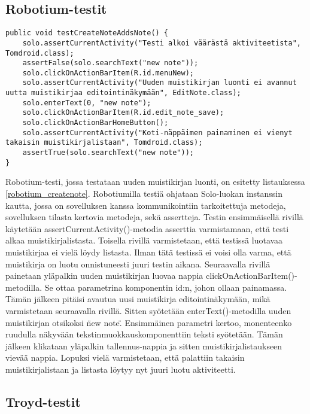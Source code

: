\subsection{Robotium-testit}

\begin{lstlisting}[float,label=robotium_createnote,caption=Muistikirjan luontitesti robotiumilla]
public void testCreateNoteAddsNote() {
	solo.assertCurrentActivity("Testi alkoi väärästä aktiviteetista", Tomdroid.class);
	assertFalse(solo.searchText("new note"));
	solo.clickOnActionBarItem(R.id.menuNew);
	solo.assertCurrentActivity("Uuden muistikirjan luonti ei avannut uutta muistikirjaa editointinäkymään", EditNote.class);
	solo.enterText(0, "new note");
	solo.clickOnActionBarItem(R.id.edit_note_save);
	solo.clickOnActionBarHomeButton();
	solo.assertCurrentActivity("Koti-näppäimen painaminen ei vienyt takaisin muistikirjalistaan", Tomdroid.class);
	assertTrue(solo.searchText("new note"));
}
\end{lstlisting}

Robotium-testi, jossa testataan uuden muistikirjan luonti, on esitetty listauksessa \ref{robotium_createnote}. Robotiumilla testiä ohjataan Solo-luokan instanssin kautta, jossa on sovelluksen kanssa kommunikointiin tarkoitettuja metodeja, sovelluksen tilasta kertovia metodeja, sekä assertteja. Testin ensimmäisellä rivillä käytetään assertCurrentActivity()-metodia asserttia varmistamaan, että testi alkaa muistikirjalistasta. Toisella rivillä varmistetaan, että testissä luotavaa muistikirjaa ei vielä löydy listasta. Ilman tätä testissä ei voisi olla varma, että muistikirja on luotu onnistuneesti juuri testin aikana. Seuraavalla rivillä painetaan yläpalkin uuden muistikirjan luovaa nappia clickOnActionBarItem()-metodilla. Se ottaa parametrina komponentin id:n, johon ollaan painamassa. Tämän jälkeen pitäisi avautua uusi muistikirja editointinäkymään, mikä varmistetaan seuraavalla rivillä. Sitten syötetään enterText()-metodilla uuden muistikirjan otsikoksi \"new note\". Ensimmäinen parametri kertoo, monenteenko ruudulla näkyvään tekstinmuokkauskomponenttiin teksti syötetään. Tämän jälkeen klikataan yläpalkin tallennus-nappia ja sitten muistikirjalistaukseen vievää nappia. Lopuksi vielä varmistetaan, että palattiin takaisin muistikirjalistaan ja listasta löytyy nyt juuri luotu aktiviteetti.

\subsection{Troyd-testit}

